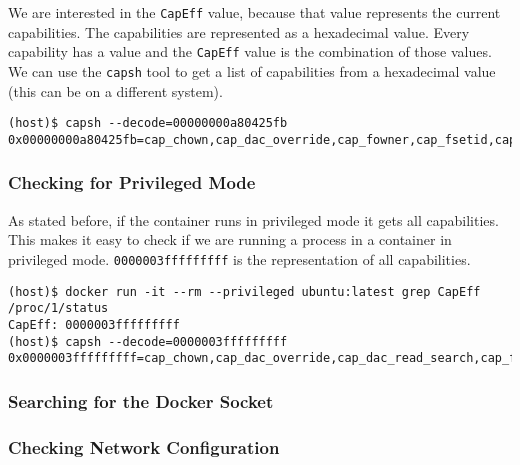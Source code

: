 We are interested in the \lstinline{CapEff} value, because that value represents the current capabilities. The capabilities are represented as a hexadecimal value. Every capability has a value and the \lstinline{CapEff} value is the combination of those values. We can use the \lstinline{capsh} tool to get a list of capabilities from a hexadecimal value (this can be on a different system).

\begin{lstlisting}
(host)$ capsh --decode=00000000a80425fb
0x00000000a80425fb=cap_chown,cap_dac_override,cap_fowner,cap_fsetid,cap_kill,cap_setgid,cap_setuid,cap_setpcap,cap_net_bind_service,cap_net_raw,cap_sys_chroot,cap_mknod,cap_audit_write,cap_setfcap
\end{lstlisting}

\subsubsection{Checking for Privileged Mode}

As stated before, if the container runs in privileged mode it gets all capabilities. This makes it easy to check if we are running a process in a container in privileged mode. \lstinline{0000003fffffffff} is the representation of all capabilities.

\begin{lstlisting}
(host)$ docker run -it --rm --privileged ubuntu:latest grep CapEff /proc/1/status
CapEff:	0000003fffffffff
(host)$ capsh --decode=0000003fffffffff 
0x0000003fffffffff=cap_chown,cap_dac_override,cap_dac_read_search,cap_fowner,cap_fsetid,cap_kill,cap_setgid,cap_setuid,cap_setpcap,cap_linux_immutable,cap_net_bind_service,cap_net_broadcast,cap_net_admin,cap_net_raw,cap_ipc_lock,cap_ipc_owner,cap_sys_module,cap_sys_rawio,cap_sys_chroot,cap_sys_ptrace,cap_sys_pacct,cap_sys_admin,cap_sys_boot,cap_sys_nice,cap_sys_resource,cap_sys_time,cap_sys_tty_config,cap_mknod,cap_lease,cap_audit_write,cap_audit_control,cap_setfcap,cap_mac_override,cap_mac_admin,cap_syslog,cap_wake_alarm,cap_block_suspend,cap_audit_read
\end{lstlisting}

\subsubsection{Searching for the Docker Socket}

\subsubsection{Checking Network Configuration}
